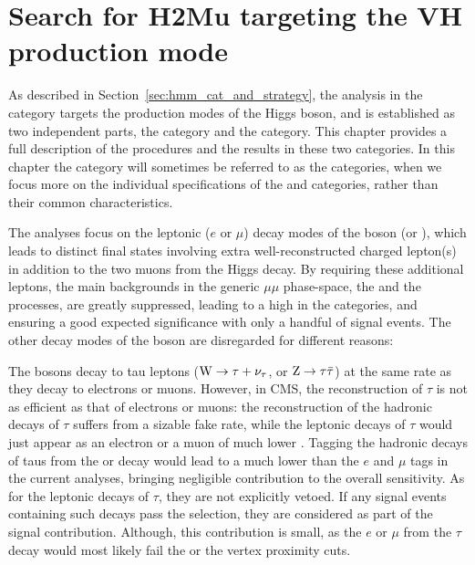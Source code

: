 \chapter{Search for H2Mu targeting the VH production mode}

As described in Section~\ref{sec:hmm_cat_and_strategy}, the analysis in the \VH category targets the \VH production modes of the Higgs boson, 
and is established as two independent parts, the \WH category and the \ZH category.
This chapter provides a full description of the procedures and the results in these two categories.
In this chapter the \VH category will sometimes be referred to as the \VH categories, 
when we focus more on the individual specifications of the \WH and \ZH categories, rather than their common characteristics.

The \VH analyses focus on the leptonic ($e$ or $\mu$) decay modes of the \PV boson (\PW or \PZ), 
which leads to distinct final states involving extra well-reconstructed charged lepton(s) in addition to the two muons from the Higgs decay.
By requiring these additional leptons, the main backgrounds in the generic $\mu\mu$ phase-space, the \DY and the \ttbar processes, are greatly suppressed,
leading to a high \SoB in the \VH categories, and ensuring a good expected significance with only a handful of signal events.
The other decay modes of the \PV boson are disregarded for different reasons:

The \PV bosons decay to tau leptons ($\mathrm{W} \to \tau+\nu_{\tau}$, or $\mathrm{Z} \to \tau\bar{\tau}$) at the same rate as they decay to electrons or muons. 
However, in CMS, the reconstruction of $\tau$ is not as efficient as that of electrons or muons: 
the reconstruction of the hadronic decays of $\tau$ suffers from a sizable fake rate, 
while the leptonic decays of $\tau$ would just appear as an electron or a muon of much lower \pt.
Tagging the hadronic decays of taus from the \PW or \PZ decay would lead to a much lower \SoB than the $e$ and $\mu$ tags in the current \VH analyses,
bringing negligible contribution to the overall sensitivity.
As for the leptonic decays of $\tau$, they are not explicitly vetoed.
If any \VH signal events containing such decays pass the selection, they are considered as part of the signal contribution.
Although, this contribution is small, as the $e$ or $\mu$ from the $\tau$ decay would most likely fail the \pt or the vertex proximity cuts.

